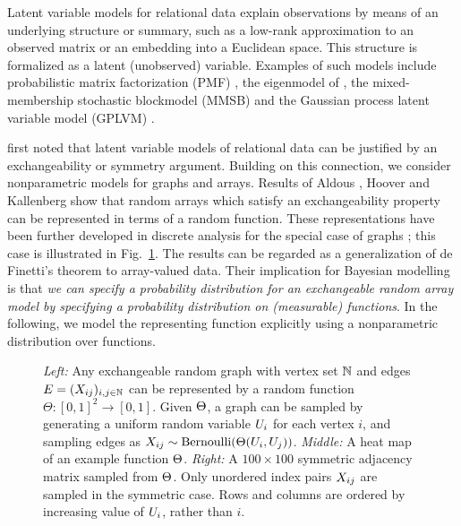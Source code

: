 Latent variable models for relational data explain observations by means of an underlying structure
or summary,
such as a low-rank approximation to an observed matrix or an embedding into a Euclidean space.
This structure is formalized as a latent (unobserved) variable.
Examples of such models include probabilistic matrix factorization (PMF) \citep{Salakhutdinov2008}, the eigenmodel of 
\citet{Hoff2007a}, the mixed-membership stochastic blockmodel (MMSB) \citep{Airoldi2008}
and the Gaussian process latent variable model (GPLVM) \citep[e.g.][]{Lawrence2009}.

\citet{Hoff2007a} first noted that latent variable models of relational data can be justified by an exchangeability or symmetry argument.
Building on this connection, we consider nonparametric models for graphs and arrays.
Results of
Aldous \cite{Aldous:1981}, Hoover \cite{Hoover:1979} and Kallenberg \cite{Kallenberg:1992} show
that random arrays which satisfy an exchangeability property can be represented in terms of a random
function. These representations have been further developed in discrete analysis for the
special case of graphs \citep{Lovasz:Szegedy:2006}; this case is illustrated in Fig.~\ref{fig:W:graph}.
The results can be regarded as a generalization of de Finetti's theorem to array-valued data.
Their implication for Bayesian modelling is that
\emph{we can specify a probability distribution for an exchangeable random array model by specifying a probability distribution on (measurable) functions}.
In the following, we model the representing function explicitly using a nonparametric distribution over functions.

\begin{figure}
 \begin{center}
    
  \end{center}
 \caption{\emph{Left:} Any exchangeable random graph with vertex set $\mathbb{N}$ and edges ${E=(X_{ij})_{i,j\in\mathbb{N}}}$ can be represented
   by a random function ${\Theta:[0,1]^2\rightarrow[0,1]}$. Given $\Theta$, a graph can be sampled by generating a uniform random 
   variable $U_i$ for each vertex $i$, and sampling edges as ${X_{ij}\sim\mbox{\rm Bernoulli}(\Theta(U_i,U_j))}$.
   \emph{Middle:} A heat map of an example function $\Theta$.
   \emph{Right:} A ${100\times 100}$ symmetric adjacency matrix sampled from $\Theta$.
   Only unordered index pairs $X_{ij}$ are sampled in the symmetric case. Rows and columns are ordered
   by increasing value of $U_i$, rather than $i$.}
 \label{fig:W:graph}
\end{figure}


